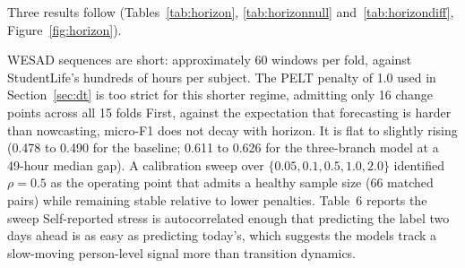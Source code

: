 \documentclass[preprint,12pt,authoryear]{elsarticle}
\newcommand{\dt}{$\Delta T$}
\providecommand{\DIFaddtex}[1]{{\protect\color{blue} \sf #1}} %
\providecommand{\DIFdeltex}[1]{{\protect\color{red} \scriptsize #1}} %
\providecommand{\DIFaddbegin}{} %
\providecommand{\DIFaddend}{} %
\providecommand{\DIFdelbegin}{} %
\providecommand{\DIFdelend}{} %
\providecommand{\DIFadd}[1]{\texorpdfstring{\DIFaddtex{#1}}{#1}} %
\providecommand{\DIFdel}[1]{\texorpdfstring{\DIFdeltex{#1}}{}} %
\newcommand{\DIFscaledelfig}{0.5}
\newlength{\DIFdelgraphicswidth} %
\newlength{\DIFdelgraphicsheight} %
\newcommand{\DIFaddincludegraphics}[2][]{{\color{blue}\fbox{\DIFOincludegraphics[#1]{#2}}}} %
\newcommand{\DIFdelincludegraphics}[2][]{%
\sbox{\DIFdelgraphicsbox}{\DIFOincludegraphics[#1]{#2}}%
\settoboxwidth{\DIFdelgraphicswidth}{\DIFdelgraphicsbox} %
\settoboxtotalheight{\DIFdelgraphicsheight}{\DIFdelgraphicsbox} %
\scalebox{\DIFscaledelfig}{%
\parbox[b]{\DIFdelgraphicswidth}{\usebox{\DIFdelgraphicsbox}\\[-\baselineskip] \rule{\DIFdelgraphicswidth}{0em}}\llap{\resizebox{\DIFdelgraphicswidth}{\DIFdelgraphicsheight}{%
\setlength{\unitlength}{\DIFdelgraphicswidth}%
\begin{picture}(1,1)%
\thicklines\linethickness{2pt} %
{\color[rgb]{1,0,0}\put(0,0){\framebox(1,1){}}}%
{\color[rgb]{1,0,0}\put(0,0){\line( 1,1){1}}}%
{\color[rgb]{1,0,0}\put(0,1){\line(1,-1){1}}}%
\end{picture}%
}\hspace*{3pt}}} %
} %
\DeclareRobustCommand{\DIFaddbegin}{\DIFOaddbegin \let\includegraphics\DIFaddincludegraphics} %
\DeclareRobustCommand{\DIFaddend}{\DIFOaddend \let\includegraphics\DIFOincludegraphics} %
\DeclareRobustCommand{\DIFdelbegin}{\DIFOdelbegin \let\includegraphics\DIFdelincludegraphics} %
\DeclareRobustCommand{\DIFdelend}{\DIFOaddend \let\includegraphics\DIFOincludegraphics} %
\begin{document}
\DIFadd{Three results follow (Tables~\ref{tab:horizon},
\ref{tab:horizonnull} and~\ref{tab:horizondiff},
Figure~\ref{fig:horizon})}\DIFaddend .

\DIFdelbegin %
\DIFdel{WESAD sequences are short: approximately
60 windows per fold, against StudentLife's hundreds of hours per subject. The PELT penalty of 1.0 used in Section~\ref{sec:dt} is too strict for
this shorter regime, admitting only 16 change points across all
15 folds }\DIFdelend \DIFaddbegin \DIFadd{First, against the expectation that forecasting is harder than
nowcasting, micro-F1 does not decay with horizon. It is flat to
slightly rising (0.478 to 0.490 for the baseline; 0.611 to 0.626 for
the three-branch model at a 49-hour median gap)}\DIFaddend . \DIFdelbegin \DIFdel{A calibration sweep over $\{0.05, 0.1, 0.5, 1.0, 2.0\}$ identified
$\rho = 0.5$ as the operating point that admits a healthy sample size
(66 matched pairs) while remaining stable relative to lower penalties.
Table~6 reports the sweep}\DIFdelend \DIFaddbegin \DIFadd{Self-reported stress
is autocorrelated enough that predicting the label two days ahead is as
easy as predicting today's, which suggests the models track a
slow-moving person-level signal more than transition dynamics}\DIFaddend .

\DIFdelbegin %
\end{document}

